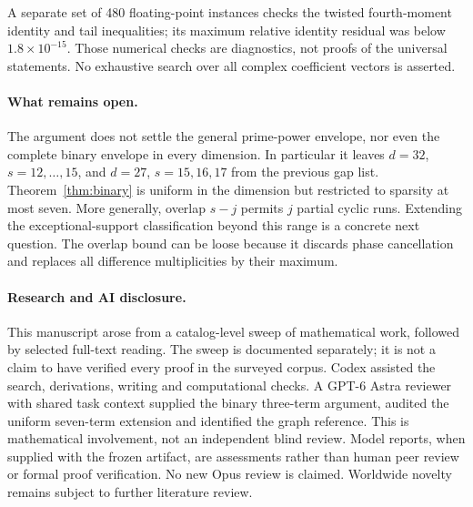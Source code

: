 \documentclass[11pt,a4paper]{article}
\theoremstyle{remark}\newtheorem{remark}[theorem]{Remark}
\begin{document}
A separate set of 480 floating-point instances checks the twisted fourth-moment identity and tail inequalities; its maximum relative identity residual was below $1.8\times10^{-15}$. Those numerical checks are diagnostics, not proofs of the universal statements. No exhaustive search over all complex coefficient vectors is asserted.

\paragraph{What remains open.}
The argument does not settle the general prime-power envelope, nor even the complete binary envelope in every dimension. In particular it leaves $d=32$, $s=12,\ldots,15$, and $d=27$, $s=15,16,17$ from the previous gap list. Theorem~\ref{thm:binary} is uniform in the dimension but restricted to sparsity at most seven. More generally, overlap $s-j$ permits $j$ partial cyclic runs. Extending the exceptional-support classification beyond this range is a concrete next question. The overlap bound can be loose because it discards phase cancellation and replaces all difference multiplicities by their maximum.

\paragraph{Research and AI disclosure.}
This manuscript arose from a catalog-level sweep of mathematical work, followed by selected full-text reading. The sweep is documented separately; it is not a claim to have verified every proof in the surveyed corpus. Codex assisted the search, derivations, writing and computational checks. A GPT-6 Astra reviewer with shared task context supplied the binary three-term argument, audited the uniform seven-term extension and identified the graph reference. This is mathematical involvement, not an independent blind review. Model reports, when supplied with the frozen artifact, are assessments rather than human peer review or formal proof verification. No new Opus review is claimed. Worldwide novelty remains subject to further literature review.
\end{document}
